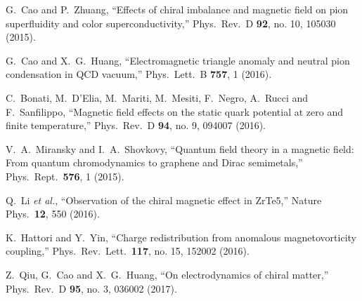 \documentclass[aps,prd,amsmath,two column,amssymb,showpacs]{revtex4}
\begin{document}
\begin{thebibliography}{99}
G.~Cao and P.~Zhuang,
``Effects of chiral imbalance and magnetic field on pion superfluidity and color superconductivity,''
Phys.\ Rev.\ D {\bf 92}, no. 10, 105030 (2015).%

G.~Cao and X.~G.~Huang,
``Electromagnetic triangle anomaly and neutral pion condensation in QCD vacuum,''
Phys.\ Lett.\ B {\bf 757}, 1 (2016).%

C.~Bonati, M.~D'Elia, M.~Mariti, M.~Mesiti, F.~Negro, A.~Rucci and F.~Sanfilippo,
``Magnetic field effects on the static quark potential at zero and finite temperature,''
Phys.\ Rev.\ D {\bf 94}, no. 9, 094007 (2016).%

V.~A.~Miransky and I.~A.~Shovkovy,
``Quantum field theory in a magnetic field: From quantum chromodynamics to graphene and Dirac semimetals,''
Phys.\ Rept.\  {\bf 576}, 1 (2015).

Q.~Li {\it et al.},
``Observation of the chiral magnetic effect in ZrTe5,''
Nature Phys.\  {\bf 12}, 550 (2016).%

K.~Hattori and Y.~Yin,
``Charge redistribution from anomalous magnetovorticity coupling,''
Phys.\ Rev.\ Lett.\  {\bf 117}, no. 15, 152002 (2016).%

Z.~Qiu, G.~Cao and X.~G.~Huang,
``On electrodynamics of chiral matter,''
Phys.\ Rev.\ D {\bf 95}, no. 3, 036002 (2017).%


\end{thebibliography}
\end{document}

